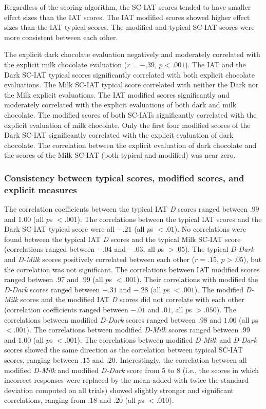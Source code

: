 \documentclass[12pt]{book}
\begin{document}
Regardless of the scoring algorithm, the SC-IAT scores tended to have smaller effect sizes than the IAT scores.
The IAT modified scores showed higher effect sizes than the IAT typical scores. The modified and typical SC-IAT scores were more consistent between each other. 

The explicit dark chocolate evaluation negatively and moderately correlated with the explicit milk chocolate evaluation ($r = -.39$, $p < .001$). The IAT and the Dark SC-IAT typical scores significantly correlated with both explicit chocolate evaluations. 
The Milk SC-IAT typical score correlated with neither the Dark nor the Milk explicit evaluations. 
The IAT modified scores significantly and moderately correlated with the explicit evaluations of both dark and milk chocolate.
The modified scores of both SC-IATs significantly correlated with the explicit evaluation of milk chocolate. Only the first four modified scores of the Dark SC-IAT significantly correlated with the explicit evaluation of dark chocolate. 
The correlation between the explicit evaluation of dark chocolate and the scores of the Milk SC-IAT (both typical and modified) was near zero. 

\subsubsection{Consistency between typical scores, modified scores, and explicit measures}

The correlation coefficients between the typical IAT \emph{D} scores ranged between $.99$ and $1.00$ (all $p$s $< .001$). The correlations between the typical IAT scores and the Dark SC-IAT typical score were all $-.21$ (all $p$s $<.01$). 
No correlations were found between the typical IAT \emph{D} scores and the typical Milk SC-IAT score (correlations ranged between $-.04$ and $-.03$, all $p$s $>.05$). The typical \emph{D-Dark} and \emph{D-Milk} scores positively correlated between each other ($r = .15$, $p > .05$), but the correlation was not significant. 
The correlations between IAT modified scores ranged between $.97$ and $.99$ (all $p$s $< .001$). 
Their correlations with modified the \emph{D-Dark} scores ranged between $-.31$ and $-.28$ (all $p$s $<.001$). 
The modified \emph{D-Milk} scores and the modified IAT \emph{D} scores did not correlate with each other (correlation coefficients ranged between $-.01$ and $.01$, all $p$s $> .050$). 
The correlations between modified \emph{D-Dark} scores ranged between $.98$ and $1.00$ (all $p$s $<.001$). The correlations between modified \emph{D-Milk} scores ranged between $.99$ and $1.00$ (all $p$s $<.001$). The correlations between modified \emph{D-Milk} and \emph{D-Dark} scores showed the same direction as the correlation between typical SC-IAT scores, ranging between $.15$ and $.20$. 
Interestingly, the correlation between all modified \emph{D-Milk} and modified \emph{D-Dark} score from 5 to 8 (i.e., the scores in which  incorrect responses were replaced by the mean added with twice the standard deviation computed on all trials) showed slightly stronger and significant correlations, ranging from $.18$ and $.20$ (all $p$s $<.010$). 
\end{document}
